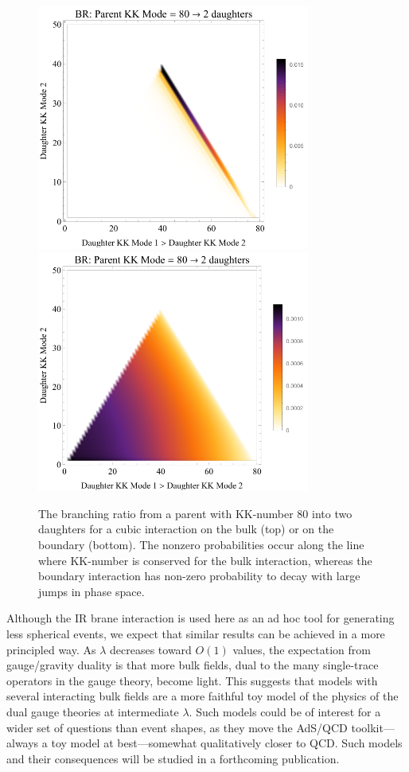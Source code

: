 \begin{figure}[tb!]
	\centering
	\includegraphics[width=0.8\textwidth]{figures/DS_KKBR_bulk.pdf}\vspace{1cm}
	\includegraphics[width=0.8\textwidth]{figures/DS_KKBR_boundary.pdf}
	\caption{The branching ratio from a parent with KK-number 80 into two daughters for a cubic interaction on the bulk (top) or on the boundary (bottom). The nonzero probabilities occur along the line where KK-number is conserved for the bulk interaction, whereas the boundary interaction has non-zero probability to decay with large jumps in phase space. }
	\label{fig:BR}
\end{figure}

Although the IR brane interaction is used here as an ad hoc tool for generating less spherical events, we expect that similar results can be achieved in a more principled way. As $\lambda$ decreases toward $O(1)$ values, the expectation from gauge/gravity duality is that more bulk fields, dual to the many single-trace operators in the gauge theory, become light. This suggests that models with several interacting bulk fields are a more faithful toy model of the physics of the dual gauge theories at intermediate $\lambda$. Such models could be of interest for a wider set of questions than event shapes, as they move the AdS/QCD toolkit---always a toy model at best---somewhat qualitatively closer to QCD. Such models and their consequences will be studied in a forthcoming publication.

